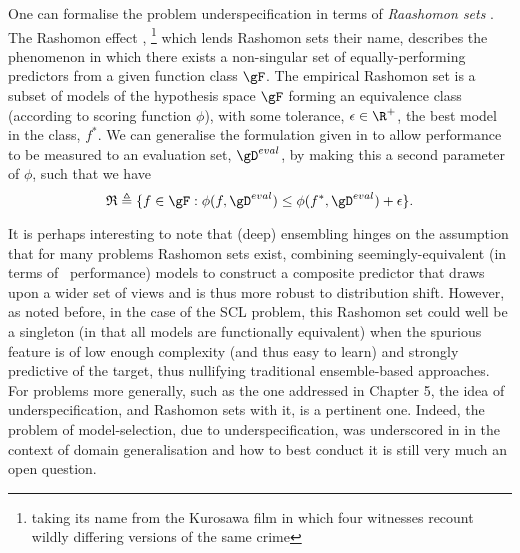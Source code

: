 %
One can formalise the problem underspecification in terms of \emph{Raashomon sets}
\citep{semenova2019study}.
The Rashomon effect \citep{breiman2001statistical},
%
\footnote{taking its name from the Kurosawa film
in which four witnesses recount wildly differing versions of the same crime}
%
which lends Rashomon sets their name, describes the phenomenon in which there exists a
non-singular set of equally-performing predictors from a given function class $\gF$.
%
 The empirical Rashomon set is a subset of models of the hypothesis space $\gF$ forming an
 equivalence class (according to scoring function $\phi$), with some tolerance, $\epsilon \in \R^+$, \wrt{}
 the best model in the class, $f^\ast$. 
%
We can generalise the formulation given in \citet{semenova2019study} to allow performance to be
measured \wrt{} to an evaluation set,  $\gD^{eval}$, by making this a second parameter of
$\phi$, such that we have
%
\begin{equation*}
  \frak{R} \triangleq 
  \{ 
    f \in \gF: \phi(f, \gD^{eval}) 
    \leq 
    \phi( f^\ast, \gD^{eval} ) + \epsilon 
  \}.
\end{equation*}

It is perhaps interesting to note that (deep) ensembling hinges on the assumption that for many
problems Rashomon sets exist, combining seemingly-equivalent (in terms of \iid{}\ performance)
models to construct a composite predictor that draws upon a wider set of views and is thus more
robust to distribution shift.
%
However, as noted before, in the case of the SCL problem, this Rashomon set could well be a
singleton (in that all models are functionally equivalent) when the spurious feature is of low
enough complexity (and thus easy to learn) and strongly predictive of the target, thus nullifying
traditional ensemble-based approaches.
%
For \ood{} problems more generally, such as the one addressed in Chapter 5, the idea of
underspecification, and Rashomon sets with it, is a pertinent one.
%
Indeed, the problem of model-selection, due to underspecification, was underscored in
\cite{gulrajani2020search} in the context of domain generalisation and how to best conduct it is
still very much an open question.


